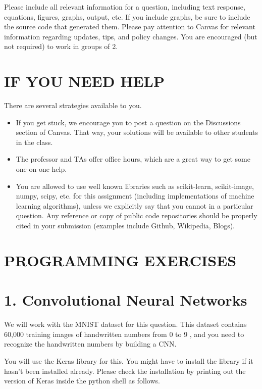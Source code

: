 \documentclass[10pt]{article}
\begin{document}
Please include all relevant information for a question, including text response, equations, figures, graphs, output, etc. If you include graphs, be sure to include the source code that generated them. Please pay attention to Canvas for relevant information regarding updates, tips, and policy changes. You are encouraged (but not required) to work in groups of 2.

\section*{IF YOU NEED HELP}
There are several strategies available to you.

\begin{itemize}
  \item If you get stuck, we encourage you to post a question on the Discussions section of Canvas. That way, your solutions will be available to other students in the class.

  \item The professor and TAs offer office hours, which are a great way to get some one-on-one help.

  \item You are allowed to use well known libraries such as scikit-learn, scikit-image, numpy, scipy,
etc. for this assignment (including implementations of machine learning algorithms), unless we explicitly say that you cannot in a particular question. Any reference or copy of public code repositories should be properly cited in your submission (examples include Github, Wikipedia, Blogs).

\end{itemize}

\section*{PROGRAMMING EXERCISES}
\section*{1. Convolutional Neural Networks}
We will work with the MNIST dataset for this question. This dataset contains 60,000 training images of handwritten numbers from 0 to 9 , and you need to recognize the handwritten numbers by building a CNN.

You will use the Keras library for this. You might have to install the library if it hasn't been installed already. Please check the installation by printing out the version of Keras inside the python shell as follows.
\end{document}

